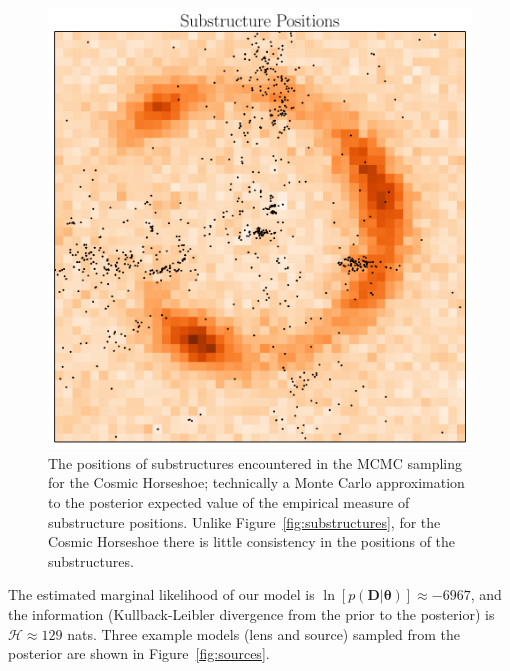 \documentclass[useAMS,usenatbib]{mn2e}
\begin{document}
\begin{figure}
\begin{center}
\includegraphics[scale=0.4]{substructures2.pdf}
\caption{The positions of substructures encountered in the MCMC sampling
for the Cosmic Horseshoe; technically a Monte Carlo approximation to the
posterior expected value of the empirical measure of substructure
positions. Unlike Figure~\ref{fig:substructures}, for the Cosmic Horseshoe
there is little consistency in the positions of the substructures.
\label{fig:substructures2}}
\end{center}
\end{figure}

The estimated marginal likelihood of our model
is
$\ln\left[p(\boldsymbol{D} | \boldsymbol{\theta})\right] \approx -6967$, and
the information (Kullback-Leibler divergence from the prior to the posterior)
is $\mathcal{H} \approx 129$ nats. 
Three example models (lens and source) sampled from the posterior are shown
in Figure~\ref{fig:sources}.
\end{document}
